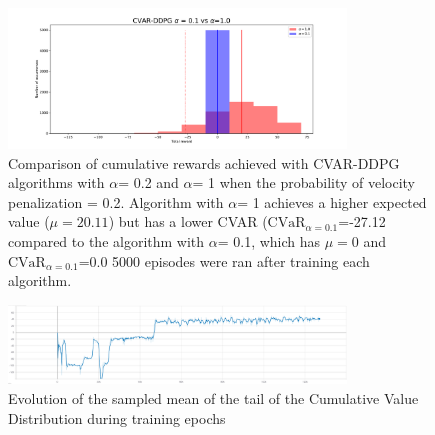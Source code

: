 \begin{figure}[ht]
        \centering
        \includegraphics[width=0.8\textwidth]{images/Car/histogram_rewards1vs01.pdf}
        \caption{Comparison of cumulative rewards achieved with CVAR-DDPG  algorithms with $\alpha$= 0.2
        and $\alpha$= 1 when the probability of velocity penalization = 0.2.
        Algorithm with $\alpha$= 1 achieves a higher expected value ($\mu=20.11$) but 
        has a lower CVAR ($\text{CVaR}_{\alpha= 0.1}$=-27.12 compared to the algorithm
        with $\alpha$= 0.1, which has $\mu=0$ and $\text{CVaR}_{\alpha= 0.1}$=0.0
        5000 episodes were ran after training each algorithm. }
        \label{histogram_alpha01_vs_alpha1}
    
\end{figure}

\begin{figure}[ht]
        \centering
        \includegraphics[width=0.8\textwidth]{images/Car/CVAR/Cvar_evol.png}
        \caption{Evolution of the sampled mean of the tail of the Cumulative Value Distribution during training epochs}
        \label{tail_CDF_EVOL}
    
\end{figure}





